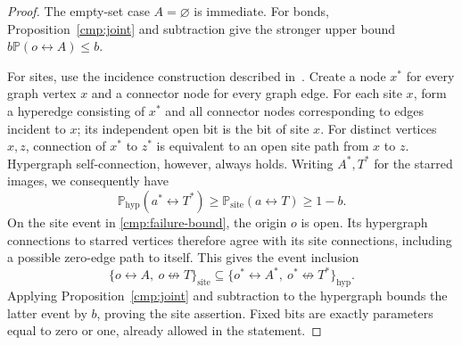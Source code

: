 \begin{proof}
The empty-set case $A=\varnothing$ is immediate. For bonds,
Proposition~\ref{cmp:joint} and subtraction give the stronger upper bound
$b\mathbb P(o\leftrightarrow A)\le b$.

For sites, use the incidence construction described
in~\cite[``One inequality for both models'']{SitePublic2026}.
Create a node $x^*$ for every graph vertex $x$ and a connector node for every
graph edge. For each site $x$, form a hyperedge consisting
of $x^*$ and all connector nodes corresponding to edges incident to $x$;
its independent open bit is the bit of site $x$. For distinct vertices
$x,z$, connection of $x^*$ to $z^*$ is equivalent to an open site path
from $x$ to $z$. Hypergraph self-connection, however, always holds.
Writing $A^*,T^*$ for the starred images, we consequently have
\[
 \mathbb P_{\mathrm{hyp}}(a^*\leftrightarrow T^*)
 \ge\mathbb P_{\mathrm{site}}(a\leftrightarrow T)\ge1-b.
\]
On the site event in \eqref{cmp:failure-bound}, the origin $o$ is open.
Its hypergraph connections to starred vertices therefore agree with its
site connections, including a possible zero-edge path to itself. This gives
the event inclusion
\[
 \{o\leftrightarrow A,\ o\not\leftrightarrow T\}_{\mathrm{site}}
 \subseteq
 \{o^*\leftrightarrow A^*,\ o^*\not\leftrightarrow T^*\}_{\mathrm{hyp}}.
\]
Applying Proposition~\ref{cmp:joint} and subtraction to the hypergraph bounds
the latter event by $b$, proving the site assertion. Fixed bits are exactly
parameters equal to zero or one, already allowed in the statement.
\end{proof}
